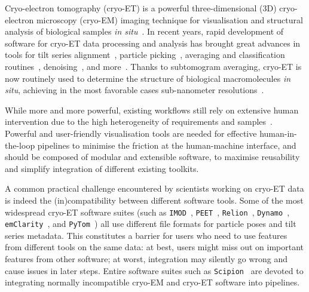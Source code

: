 Cryo-electron tomography (cryo-ET) is a powerful three-dimensional (3D) cryo-electron microscopy (cryo-EM) imaging technique for visualisation and structural analysis of biological samples \emph{in situ}~\cite{turkPromiseChallengesCryoelectron2020}. In recent years, rapid development of software for cryo-ET data processing and analysis has brought great advances in tools for tilt series alignment~\cite{zhengAreTomoIntegratedSoftware2022}, particle picking~\cite{riceTomoTwinGeneralized3D2023,wagnerSPHIREcrYOLOFastAccurate2019}, averaging and classification routines~\cite{zivanovBayesianApproachSingleparticle2022,tegunovRealtimeCryoelectronMicroscopy2019,tegunovMultiparticleCryoEMRefinement2021}, denoising~\cite{beplerTopazDenoiseGeneralDeep2020,buchholzCryoCAREContentAwareImage2018}, and more~\cite{galaz-montoyaSingleParticleTomography2015}. Thanks to subtomogram averaging, cryo-ET is now routinely used to determine the structure of biological macromolecules \emph{in situ}, achieving in the most favorable cases sub-nanometer resolutions~\cite{schurHighresolutionSituStructural2019,turonovaEfficient3DCTFCorrection2017}.

While more and more powerful, existing workflows still rely on extensive human intervention due to the high heterogeneity of requirements and samples~\cite{burtFlexibleFrameworkMultiparticle2021,scaramuzzaStepbystepGuideEfficient2021}. Powerful and user-friendly visualisation tools are needed for effective human-in-the-loop pipelines to minimise the friction at the human-machine interface, and should be composed of modular and extensible software, to maximise reusability and simplify integration of different existing toolkits.

A common practical challenge encountered by scientists working on cryo-ET data is indeed the (in)compatibility between different software tools. Some of the most widespread cryo-ET software suites (such as \texttt{IMOD}~\cite{kremerComputerVisualizationThreeDimensional1996}, \texttt{PEET}~\cite{nicastroMolecularArchitectureAxonemes2006,heumannClusteringVarianceMaps2011}, \texttt{Relion}~\cite{scheresRELIONImplementationBayesian2012}, \texttt{Dynamo}~\cite{castano-diezDynamoFlexibleUserfriendly2012}, \texttt{emClarity}~\cite{himesEmClaritySoftwareHighresolution2018}, and \texttt{PyTom}~\cite{hrabePyTomPythonbasedToolbox2012,chailletExtensiveAngularSampling2023}) all use different file formats for particle poses and tilt series metadata. This constitutes a barrier for users who need to use features from different tools on the same data: at best, users might miss out on important features from other software; at worst, integration may silently go wrong and cause issues in later steps. Entire software suites such as \texttt{Scipion}~\cite{delarosa-trevinScipionSoftwareFramework2016} are devoted to integrating normally incompatible cryo-EM and cryo-ET software into pipelines.

